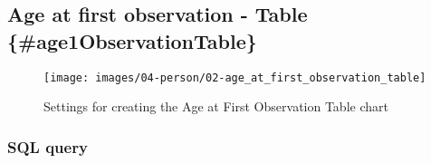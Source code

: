 \documentclass[
]{book}
\begin{document}
\hypertarget{age-at-first-observation---table-age1observationtable}{%
\subsection*{Age at first observation - Table \{\#age1ObservationTable\}}\label{age-at-first-observation---table-age1observationtable}}

\begin{figure}
\texttt{[image: images/04-person/02-age\_at\_first\_observation\_table]} \caption{Settings for creating the Age at First Observation Table chart}\label{fig:ageFirstObservationTable}
\end{figure}

\hypertarget{sql-query-7}{%
\subsubsection*{SQL query}\label{sql-query-7}}
\end{document}
